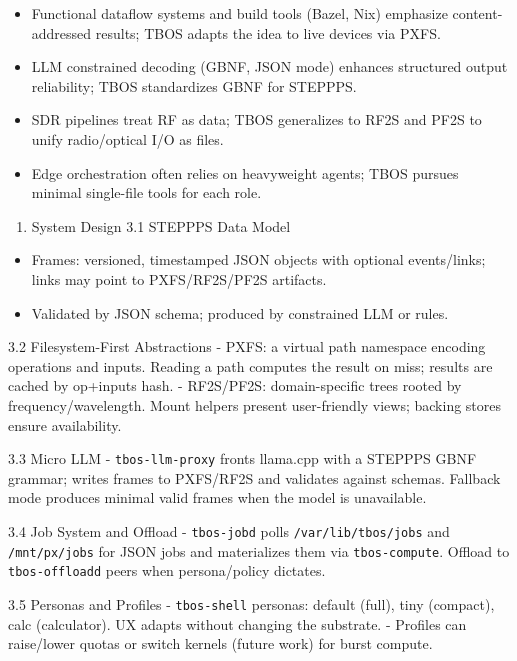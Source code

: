 \documentclass[]{article}
\providecommand{\tightlist}{%
  \setlength{\itemsep}{0pt}\setlength{\parskip}{0pt}}
\begin{document}
\begin{itemize}
\tightlist
\item
  Functional dataflow systems and build tools (Bazel, Nix) emphasize
  content-addressed results; TBOS adapts the idea to live devices via
  PXFS.
\item
  LLM constrained decoding (GBNF, JSON mode) enhances structured output
  reliability; TBOS standardizes GBNF for STEPPPS.
\item
  SDR pipelines treat RF as data; TBOS generalizes to RF2S and PF2S to
  unify radio/optical I/O as files.
\item
  Edge orchestration often relies on heavyweight agents; TBOS pursues
  minimal single-file tools for each role.
\end{itemize}

\begin{enumerate}
\def\labelenumi{\arabic{enumi}.}
\setcounter{enumi}{2}
\tightlist
\item
  System Design 3.1 STEPPPS Data Model
\end{enumerate}

\begin{itemize}
\tightlist
\item
  Frames: versioned, timestamped JSON objects with optional
  events/links; links may point to PXFS/RF2S/PF2S artifacts.
\item
  Validated by JSON schema; produced by constrained LLM or rules.
\end{itemize}

3.2 Filesystem-First Abstractions - PXFS: a virtual path namespace
encoding operations and inputs. Reading a path computes the result on
miss; results are cached by op+inputs hash. - RF2S/PF2S: domain-specific
trees rooted by frequency/wavelength. Mount helpers present
user-friendly views; backing stores ensure availability.

3.3 Micro LLM - \texttt{tbos-llm-proxy} fronts llama.cpp with a STEPPPS
GBNF grammar; writes frames to PXFS/RF2S and validates against schemas.
Fallback mode produces minimal valid frames when the model is
unavailable.

3.4 Job System and Offload - \texttt{tbos-jobd} polls
\texttt{/var/lib/tbos/jobs} and \texttt{/mnt/px/jobs} for JSON jobs and
materializes them via \texttt{tbos-compute}. Offload to
\texttt{tbos-offloadd} peers when persona/policy dictates.

3.5 Personas and Profiles - \texttt{tbos-shell} personas: default
(full), tiny (compact), calc (calculator). UX adapts without changing
the substrate. - Profiles can raise/lower quotas or switch kernels
(future work) for burst compute.
\end{document}

